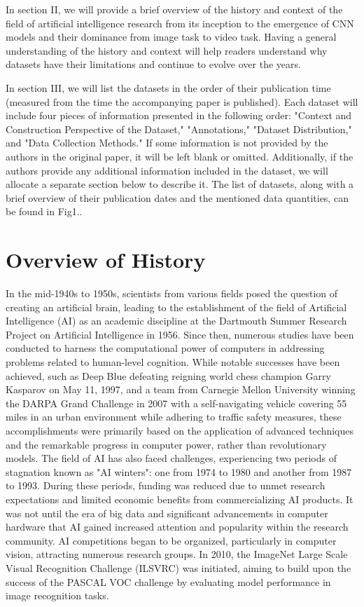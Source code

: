 \documentclass[conference]{IEEEtran}
\begin{document}
In section II, we will provide a brief overview of the history and context of the field of artificial intelligence research from its inception to the emergence of CNN models and their dominance from image task to video task. Having a general understanding of the history and context will help readers understand why datasets have their limitations and continue to evolve over the years.

In section III, we will list the datasets in the order of their publication time (measured from the time the accompanying paper is published). Each dataset will include four pieces of information presented in the following order: "Context and Construction Perspective of the Dataset," "Annotations," "Dataset Distribution," and "Data Collection Methods." If some information is not provided by the authors in the original paper, it will be left blank or omitted. Additionally, if the authors provide any additional information included in the dataset, we will allocate a separate section below to describe it. The list of datasets, along with a brief overview of their publication dates and the mentioned data quantities, can be found in Fig1..

\section{Overview of History}

In the mid-1940s to 1950s, scientists from various fields posed the question of creating an artificial brain, leading to the establishment of the field of Artificial Intelligence (AI) as an academic discipline at the Dartmouth Summer Research Project on Artificial Intelligence in 1956. Since then, numerous studies have been conducted to harness the computational power of computers in addressing problems related to human-level cognition. While notable successes have been achieved, such as Deep Blue defeating reigning world chess champion Garry Kasparov on May 11, 1997, and a team from Carnegie Mellon University winning the DARPA Grand Challenge in 2007 with a self-navigating vehicle covering 55 miles in an urban environment while adhering to traffic safety measures, these accomplishments were primarily based on the application of advanced techniques and the remarkable progress in computer power, rather than revolutionary models. The field of AI has also faced challenges, experiencing two periods of stagnation known as "AI winters": one from 1974 to 1980 and another from 1987 to 1993. During these periods, funding was reduced due to unmet research expectations and limited economic benefits from commercializing AI products. It was not until the era of big data and significant advancements in computer hardware that AI gained increased attention and popularity within the research community. AI competitions began to be organized, particularly in computer vision, attracting numerous research groups. In 2010, the ImageNet Large Scale Visual Recognition Challenge (ILSVRC) \cite{ILSVRC} was initiated, aiming to build upon the success of the PASCAL VOC challenge \cite{PASCALVOC} by evaluating model performance in image recognition tasks.
\end{document}
